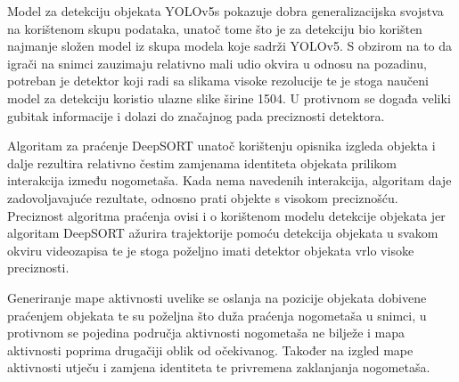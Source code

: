 \documentclass[times, utf8, seminar, numeric]{fer}
\begin{document}
Model za detekciju objekata YOLOv5s pokazuje dobra generalizacijska svojstva na korištenom skupu podataka, unatoč tome što je za detekciju bio korišten najmanje složen model iz skupa modela koje sadrži YOLOv5. S obzirom na to da igrači na snimci zauzimaju relativno mali udio okvira u odnosu na pozadinu, potreban je detektor koji radi sa slikama visoke rezolucije te je stoga naučeni model za detekciju koristio ulazne slike širine 1504. U protivnom se događa veliki gubitak informacije i dolazi do značajnog pada preciznosti detektora. 

Algoritam za praćenje DeepSORT unatoč korištenju opisnika izgleda objekta i dalje rezultira relativno čestim zamjenama identiteta objekata prilikom interakcija između nogometaša. Kada nema navedenih interakcija, algoritam daje zadovoljavajuće rezultate, odnosno prati objekte s visokom preciznošću. Preciznost algoritma praćenja ovisi i o korištenom modelu detekcije objekata jer algoritam DeepSORT ažurira trajektorije pomoću detekcija objekata u svakom okviru videozapisa te je stoga poželjno imati detektor objekata vrlo visoke preciznosti. 

Generiranje mape aktivnosti uvelike se oslanja na pozicije objekata dobivene praćenjem objekata te su poželjna što duža praćenja nogometaša u snimci, u protivnom se pojedina područja aktivnosti nogometaša ne bilježe i mapa aktivnosti poprima drugačiji oblik od očekivanog. Također na izgled mape aktivnosti utječu i zamjena identiteta te privremena zaklanjanja nogometaša.




\end{document}
